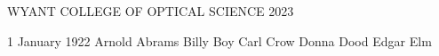 \documentclass[dissertation,CC-BY-ND]{uathesis}
\begin{document}
\maketitlepage%
{WYANT COLLEGE OF OPTICAL SCIENCE} %
{2023} %

\approval%
{1 January 1922}		%
{Arnold Abrams}		%
{Billy Boy}		%
{Carl Crow}		%
{Donna Dood}		    %
{Edgar Elm} %
{} %



\tableofcontents

\listoffigures

\listoftables




\appendix


\printbibliography
\end{document}
